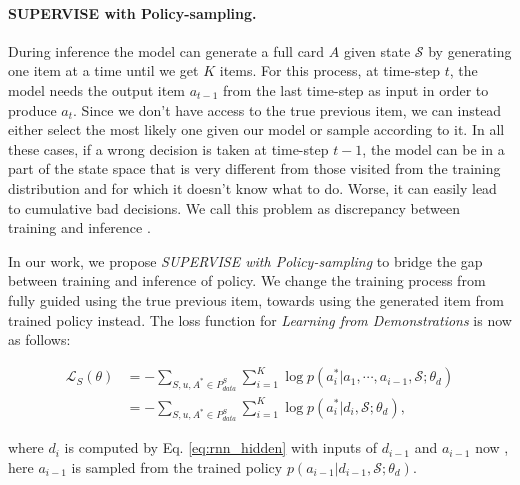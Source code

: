 \paragraph{SUPERVISE with Policy-sampling.}
During inference the model can generate a full card $A$ given state $\mathcal{S}$ by generating one item at a time
until we get $K$ items.
For this process, at time-step $t$, the model needs the output item $a_{t-1}$ from the last time-step as input in order to produce $a_t$.
Since we don't have access to the true previous item, we can instead either select the most likely one given our model or sample according to it.
In all these cases, if a wrong decision is taken at time-step $t-1$, the model can be in a part of the state space that is very different from those visited from the training distribution and for which it doesn't know what to do.
Worse, it can easily lead to cumulative bad decisions.
We call this problem as discrepancy between training and inference \cite{bengio2015scheduled}.

In our work, we propose \emph{SUPERVISE with Policy-sampling} to bridge the gap between training and inference of policy.
We change the training process from fully guided using the true previous item,
towards using the generated item from trained policy instead.
The loss function for \emph{Learning from Demonstrations} is now as follows:
\begin{small}
\begin{equation}
\label{eq:L_S}
\begin{aligned}
\mathcal{L}_{S}(\theta)&=-\sum_{S,u,A^*\in P_{data}^{S}}\sum_{i=1}^{K}\log{p(a_i^*|a_1,\cdots,a_{i-1},\mathcal{S};\theta_d)} \\
&=-\sum_{S,u,A^*\in P_{data}^{S}}\sum_{i=1}^{K}\log{p(a_i^*|d_{i},\mathcal{S};\theta_d)},
\end{aligned}
\end{equation}
\end{small}
where $d_i$ is computed by Eq. \ref{eq:rnn_hidden} with inputs of $d_{i-1}$ and $a_{i-1}$ now
, here $a_{i-1}$
is sampled from the trained policy $p(a_{i-1}|d_{i-1},\mathcal{S};\theta_d)$.

